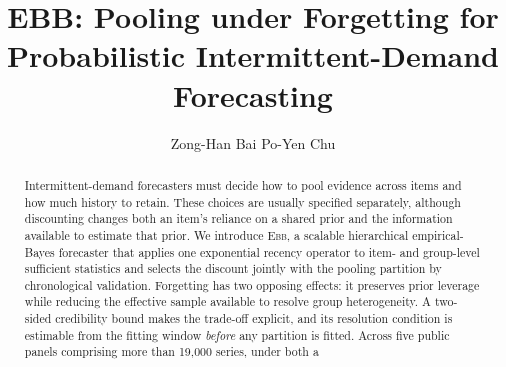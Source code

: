 \documentclass[twocolumn,10pt]{article}
\title{EBB: Pooling under Forgetting for Probabilistic
Intermittent-Demand Forecasting}
\author{Zong-Han Bai \qquad Po-Yen Chu}
\date{}
\theoremstyle{definition}
\newcommand{\EBB}{\textsc{Ebb}}
\begin{document}
\maketitle



\begin{abstract}
Intermittent-demand forecasters must decide how to pool evidence across
items and how much history to retain. These choices are usually specified
separately, although discounting changes both an item's reliance on a
shared prior and the information available to estimate that prior. We
introduce \EBB{}, a scalable hierarchical empirical-Bayes forecaster
that applies one exponential recency operator to item- and group-level
sufficient statistics and selects the discount jointly with the pooling
partition by chronological validation. Forgetting has two opposing
effects: it preserves prior leverage while reducing the effective sample
available to resolve group heterogeneity. A two-sided credibility bound
makes the trade-off explicit, and its resolution condition is estimable
from the fitting window \emph{before} any partition is fitted. %
Across five
public panels comprising more than 19{,}000 series, under both a

\end{abstract}
\end{document}
